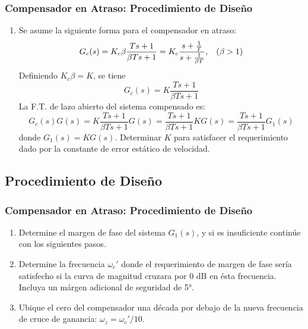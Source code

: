 \documentclass[aspectratio=169,handout]{beamer}
\theoremstyle{definition}
\theoremstyle{plain}
\theoremstyle{remark}
\newcounter{saveenumi}
\newcommand{\seti}{\setcounter{saveenumi}{\value{enumi}}}
\newcommand{\conti}{\setcounter{enumi}{\value{saveenumi}}}
\begin{document}
\begin{frame}[c]\frametitle{Compensador en Atraso: Procedimiento de Diseño}
	\begin{enumerate}
		\item<1-> Se asume la siguiente forma para el compensador en atraso:
		\begin{equation*}
			G_c(s) = K_c \beta \frac{Ts+1}{\beta Ts+1} = K_c \frac{s+\frac{1}{T}}{s+\frac{1}{\beta T}}, \hspace*{3mm} (\beta > 1)
		\end{equation*}
		\pause
		Definiendo $K_c \beta = K$, se tiene
		\begin{equation*}
			G_c(s) = K \frac{Ts+1}{\beta Ts+1}
		\end{equation*}
		\pause
		La F.T. de lazo abierto del sistema compensado es:
		\begin{equation*}
			G_c(s)G(s) = K \frac{Ts+1}{\beta Ts+1}G(s) = \frac{Ts+1}{\beta Ts+1} KG(s) = \frac{Ts+1}{\beta Ts+1} G_1(s)
		\end{equation*}
		donde $G_1(s) = KG(s)$.
		\pause
		Determinar $K$ para satisfacer el requerimiento dado por la constante de error estático de velocidad.
		\seti
	\end{enumerate}
\end{frame}

\subsection{Procedimiento de Diseño}
\begin{frame}[<+->]\frametitle{Compensador en Atraso: Procedimiento de Diseño}
	\begin{enumerate}
		\conti
		\item Determine el margen de fase del sistema $G_1(s)$, y si es insuficiente continúe con los siguientes pasos.
		\item Determine la frecuencia $\omega_c'$ donde el requerimiento de margen de fase sería satisfecho si la curva de magnitud cruzara por 0 dB en ésta frecuencia. Incluya un márgen adicional de seguridad de \ang{5}.
		\item Ubique el cero del compensador una década por debajo de la nueva frecuencia de cruce de ganancia: $\omega_z = \omega_c'/10$.
		\seti
	\end{enumerate}
\end{frame}
\end{document}
